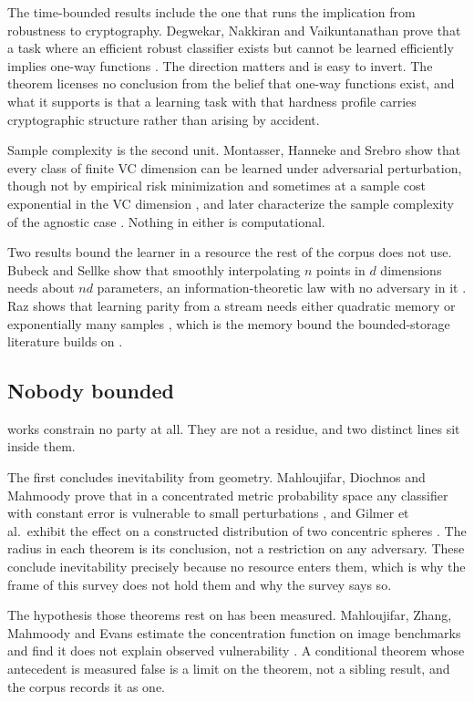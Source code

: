 The time-bounded results include the one that runs the implication from robustness
to cryptography. Degwekar, Nakkiran and Vaikuntanathan prove that a task where an
efficient robust classifier exists but cannot be learned efficiently implies
one-way functions \cite{DNV19}. The direction matters and is easy to invert. The
theorem licenses no conclusion from the belief that one-way functions exist, and
what it supports is that a learning task with that hardness profile carries
cryptographic structure rather than arising by accident.

Sample complexity is the second unit. Montasser, Hanneke and Srebro show that every
class of finite VC dimension can be learned under adversarial perturbation, though
not by empirical risk minimization and sometimes at a sample cost exponential in
the VC dimension \cite{MHS19}, and later characterize the sample complexity of the
agnostic case \cite{MHS22}. Nothing in either is computational.

Two results bound the learner in a resource the rest of the corpus does not use.
Bubeck and Sellke show that smoothly interpolating $n$ points in $d$ dimensions
needs about $nd$ parameters, an information-theoretic law with no adversary in it
\cite{BS21}. Raz shows that learning parity from a stream needs either quadratic
memory or exponentially many samples \cite{Raz16}, which is the memory bound the
bounded-storage literature builds on \cite{GZ19}.

\subsection{Nobody bounded}
\label{sec:lit-none}

\NumUnstated{} works constrain no party at all. They are not a residue, and two
distinct lines sit inside them.

The first concludes inevitability from geometry. Mahloujifar, Diochnos and Mahmoody
prove that in a concentrated metric probability space any classifier with constant
error is vulnerable to small perturbations \cite{MDM19}, and Gilmer et al.\ exhibit
the effect on a constructed distribution of two concentric spheres
\cite{GMFSRWG18}. The radius in each theorem is its conclusion, not a restriction
on any adversary. These conclude inevitability precisely because no resource enters
them, which is why the frame of this survey does not hold them and why the survey
says so.

The hypothesis those theorems rest on has been measured. Mahloujifar, Zhang,
Mahmoody and Evans estimate the concentration function on image benchmarks and find
it does not explain observed vulnerability \cite{MZME19}. A conditional theorem
whose antecedent is measured false is a limit on the theorem, not a sibling result,
and the corpus records it as one.

